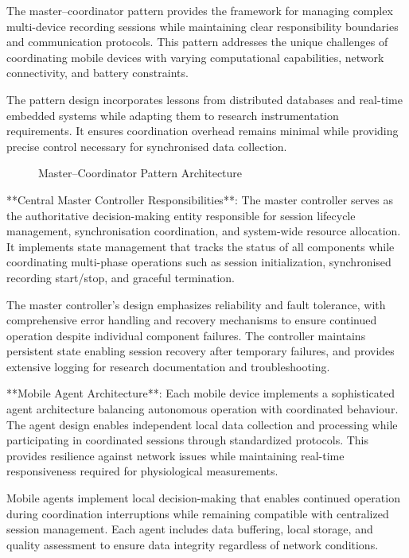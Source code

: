 \documentclass[11pt,a4paper]{report}
\begin{document}
The master--coordinator pattern provides the framework for managing complex multi-device recording sessions while maintaining clear responsibility boundaries and communication protocols. This pattern addresses the unique challenges of coordinating mobile devices with varying computational capabilities, network connectivity, and battery constraints.

The pattern design incorporates lessons from distributed databases and real-time embedded systems while adapting them to research instrumentation requirements. It ensures coordination overhead remains minimal while providing precise control necessary for synchronised data collection. 

\begin{figure}[ht]
\centering
\framebox[0.9\textwidth][c]{\rule{0pt}{4cm}}
\caption{Master–Coordinator Pattern Architecture}
\label{fig:master-coordinator}
\end{figure}

**Central Master Controller Responsibilities**: The master controller serves as the authoritative decision-making entity responsible for session lifecycle management, synchronisation coordination, and system-wide resource allocation. It implements state management that tracks the status of all components while coordinating multi-phase operations such as session initialization, synchronised recording start/stop, and graceful termination.

The master controller’s design emphasizes reliability and fault tolerance, with comprehensive error handling and recovery mechanisms to ensure continued operation despite individual component failures. The controller maintains persistent state enabling session recovery after temporary failures, and provides extensive logging for research documentation and troubleshooting.

**Mobile Agent Architecture**: Each mobile device implements a sophisticated agent architecture balancing autonomous operation with coordinated behaviour. The agent design enables independent local data collection and processing while participating in coordinated sessions through standardized protocols. This provides resilience against network issues while maintaining real-time responsiveness required for physiological measurements.

Mobile agents implement local decision-making that enables continued operation during coordination interruptions while remaining compatible with centralized session management. Each agent includes data buffering, local storage, and quality assessment to ensure data integrity regardless of network conditions.
\end{document}
